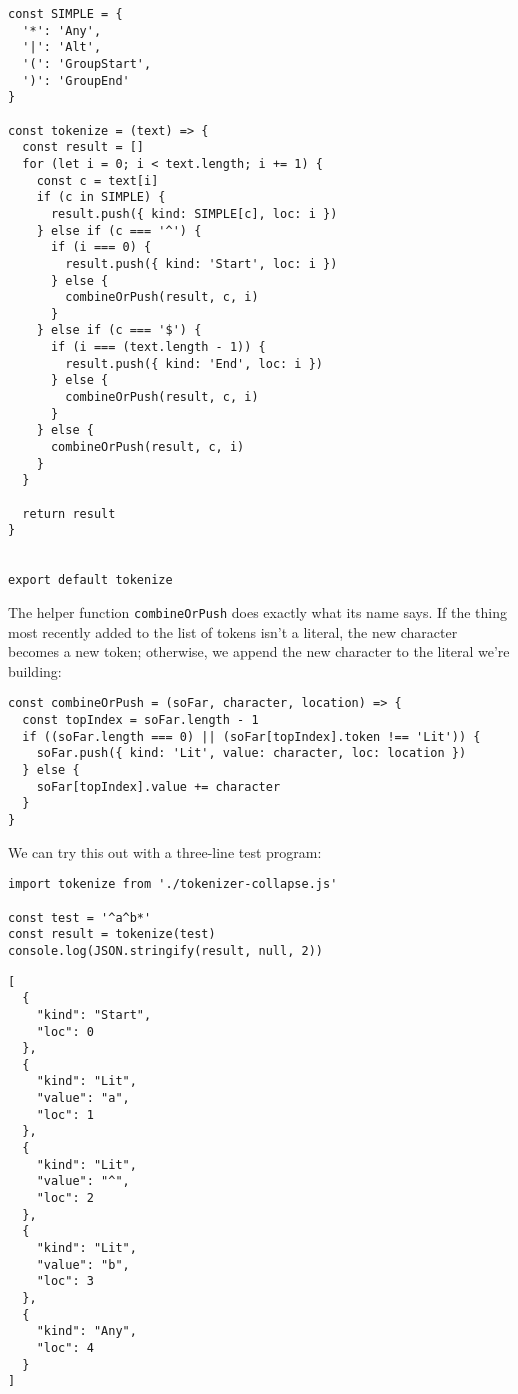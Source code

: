 \documentclass[krantzl]{krantz}
\begin{document}
\begin{lstlisting}[frame=single,frameround=tttt]
const SIMPLE = {
  '*': 'Any',
  '|': 'Alt',
  '(': 'GroupStart',
  ')': 'GroupEnd'
}

const tokenize = (text) => {
  const result = []
  for (let i = 0; i < text.length; i += 1) {
    const c = text[i]
    if (c in SIMPLE) {
      result.push({ kind: SIMPLE[c], loc: i })
    } else if (c === '^') {
      if (i === 0) {
        result.push({ kind: 'Start', loc: i })
      } else {
        combineOrPush(result, c, i)
      }
    } else if (c === '$') {
      if (i === (text.length - 1)) {
        result.push({ kind: 'End', loc: i })
      } else {
        combineOrPush(result, c, i)
      }
    } else {
      combineOrPush(result, c, i)
    }
  }

  return result
}


export default tokenize
\end{lstlisting}



The helper function \texttt{combineOrPush} does exactly what its name says.
If the thing most recently added to the list of tokens isn't a literal,
the new character becomes a new token;
otherwise,
we append the new character to the literal we're building:


\begin{lstlisting}[frame=single,frameround=tttt]
const combineOrPush = (soFar, character, location) => {
  const topIndex = soFar.length - 1
  if ((soFar.length === 0) || (soFar[topIndex].token !== 'Lit')) {
    soFar.push({ kind: 'Lit', value: character, loc: location })
  } else {
    soFar[topIndex].value += character
  }
}
\end{lstlisting}



We can try this out with a three-line test program:


\begin{lstlisting}[frame=single,frameround=tttt]
import tokenize from './tokenizer-collapse.js'

const test = '^a^b*'
const result = tokenize(test)
console.log(JSON.stringify(result, null, 2))
\end{lstlisting}



\begin{lstlisting}[frame=single,frameround=tttt]
[
  {
    "kind": "Start",
    "loc": 0
  },
  {
    "kind": "Lit",
    "value": "a",
    "loc": 1
  },
  {
    "kind": "Lit",
    "value": "^",
    "loc": 2
  },
  {
    "kind": "Lit",
    "value": "b",
    "loc": 3
  },
  {
    "kind": "Any",
    "loc": 4
  }
]
\end{lstlisting}
\end{document}
